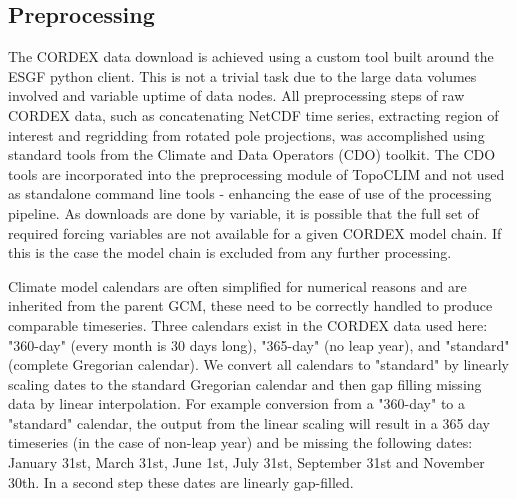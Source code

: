 \documentclass[hess, manuscript]{copernicus}
\begin{document}
\subsection{Preprocessing}
The CORDEX data download is achieved using a custom tool built around the ESGF python client. This is not a trivial task due to the large data volumes involved and variable uptime of data nodes. %
All preprocessing steps of raw CORDEX data, such as concatenating NetCDF time series, extracting region of interest and regridding from rotated pole projections, was accomplished using standard tools from the Climate and Data Operators (CDO) toolkit. The CDO tools are incorporated into the preprocessing module of TopoCLIM and not used as standalone command line tools - enhancing the ease of use of the processing pipeline. As downloads are done by variable, it is possible that the full set of required forcing variables are not available for a given CORDEX model chain. If this is the case the model chain is excluded from any further processing. 

Climate model calendars are often simplified for numerical reasons and are inherited from the parent GCM, these need to be correctly handled to produce comparable timeseries. Three calendars exist in the CORDEX data used here: "360-day" (every month is 30 days long), "365-day" (no leap year), and "standard" (complete Gregorian calendar). We convert all calendars to "standard" by linearly scaling dates to the standard Gregorian calendar and then gap filling missing data by linear interpolation. For example conversion from a "360-day"  to a "standard" calendar, the output from the linear scaling will result in a 365 day timeseries (in the case of non-leap year) and be missing the following dates: January 31st, March 31st, June 1st, July 31st, September 31st and November 30th. In a second step these dates are linearly gap-filled.
\end{document}
